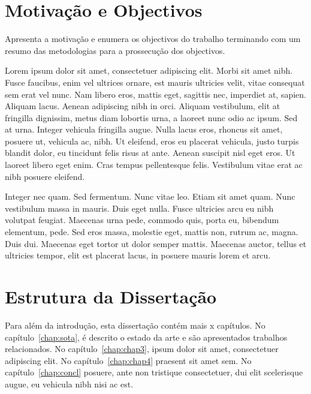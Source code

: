 \section{Motivação e Objectivos} \label{sec:goals}

Apresenta a motivação e enumera os objectivos do trabalho terminando
com um resumo das metodologias para a prossecução dos objectivos.

Lorem ipsum dolor sit amet, consectetuer adipiscing elit. Morbi sit
amet nibh. Fusce faucibus, enim vel ultrices ornare, est mauris
ultricies velit, vitae consequat sem erat vel nunc. Nam libero eros,
mattis eget, sagittis nec, imperdiet at, sapien. Aliquam lacus. Aenean
adipiscing nibh in orci. Aliquam vestibulum, elit at fringilla
dignissim, metus diam lobortis urna, a laoreet nunc odio ac ipsum. Sed
at urna. Integer vehicula fringilla augue. Nulla lacus eros, rhoncus
sit amet, posuere ut, vehicula ac, nibh. Ut eleifend, eros eu placerat
vehicula, justo turpis blandit dolor, eu tincidunt felis risus at
ante. Aenean suscipit nisl eget eros. Ut laoreet libero eget
enim. Cras tempus pellentesque felis. Vestibulum vitae erat ac nibh
posuere eleifend. 

Integer nec quam. Sed fermentum. Nunc vitae leo. Etiam sit amet
quam. Nunc vestibulum massa in mauris. Duis eget nulla. Fusce
ultricies arcu eu nibh volutpat feugiat. Maecenas urna pede, commodo
quis, porta eu, bibendum elementum, pede. Sed eros massa, molestie
eget, mattis non, rutrum ac, magna. Duis dui. Maecenas eget tortor ut
dolor semper mattis. Maecenas auctor, tellus et ultricies tempor, elit
est placerat lacus, in posuere mauris lorem et arcu. 

\section{Estrutura da Dissertação} \label{sec:struct}

Para além da introdução, esta dissertação contém mais x capítulos.
No capítulo~\ref{chap:sota}, é descrito o estado da arte e são
apresentados trabalhos relacionados. 
No capítulo~\ref{chap:chap3}, ipsum dolor sit amet, consectetuer
adipiscing elit.
No capítulo~\ref{chap:chap4} praesent sit amet sem. 
No capítulo~\ref{chap:concl}  posuere, ante non tristique
consectetuer, dui elit scelerisque augue, eu vehicula nibh nisi ac
est. 
